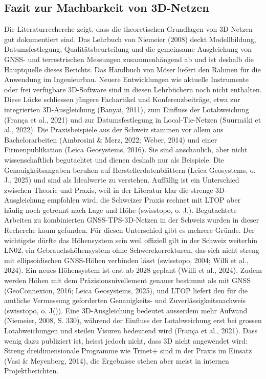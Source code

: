 \subsection{Fazit zur Machbarkeit von 3D-Netzen}
\label{sec:Fazit zur Literaturrecherche}

Die Literaturrecherche zeigt, dass die theoretischen Grundlagen von 3D-Netzen gut dokumentiert sind. 
Das Lehrbuch von Niemeier (2008) deckt Modellbildung, Datumsfestlegung, Qualitätsbeurteilung und die gemeinsame Ausgleichung von GNSS- und terrestrischen Messungen zusammenhängend ab und ist deshalb die Hauptquelle dieses Berichts.
Das Handbuch von Möser liefert den Rahmen für die Anwendung im Ingenieurbau.
Neuere Entwicklungen wie aktuelle Instrumente oder frei verfügbare 3D-Software sind in diesen Lehrbüchern noch nicht enthalten.
Diese Lücke schliessen jüngere Fachartikel und Konferenzbeiträge, etwa zur integrierten 3D-Ausgleichung (Banyai, 2011), zum Einfluss der Lotabweichung (França et al., 2021) und zur Datumsfestlegung in Local-Tie-Netzen (Suurmäki et al., 2022). 
Die Praxisbeispiele aus der Schweiz stammen vor allem aus Bachelorarbeiten (Ambrosini \& Merz, 2022; Weber, 2014) und einer Firmenpublikation (Leica Geosystems, 2016).
Sie sind anschaulich, aber nicht wissenschaftlich begutachtet und dienen deshalb nur als Beispiele.
Die Genauigkeitsangaben beruhen auf Herstellerdatenblättern (Leica Geosystems, o. J., 2025) und sind als Idealwerte zu verstehen. 
Auffällig ist ein Unterschied zwischen Theorie und Praxis, weil in der Literatur klar die strenge 3D-Ausgleichung empfohlen wird, die Schweizer Praxis rechnet mit LTOP aber häufig noch getrennt nach Lage und Höhe (swisstopo, o. J.). 
Begutachtete Arbeiten zu kombinierten GNSS-TPS-3D-Netzen in der Schweiz wurden in dieser Recherche kaum gefunden.
Für diesen Unterschied gibt es mehrere Gründe. 
Der wichtigste dürfte das Höhensystem sein weil offiziell gilt in der Schweiz weiterhin LN02, ein Gebrauchshöhensystem ohne Schwerekorrekturen, das sich nicht streng mit ellipsoidischen GNSS-Höhen verbinden lässt (swisstopo, 2004; Willi et al., 2024). 
Ein neues Höhensystem ist erst ab 2028 geplant (Willi et al., 2024). 
Zudem werden Höhen mit dem Präzisionsnivellement genauer bestimmt als mit GNSS (GeoConnexion, 2016; Leica Geosystems, 2025), und LTOP liefert den für die amtliche Vermessung geforderten Genauigkeits- und Zuverlässigkeitsnachweis (swisstopo, o. J()). 
Eine 3D-Ausgleichung bedeutet ausserdem mehr Aufwand (Niemeier, 2008, S. 330), während der Einfluss der Lotabweichung erst bei grossen Lotabweichungen und steilen Visuren bedeutend wird (França et al., 2021). 
Dass wenig dazu publiziert ist, heisst jedoch nicht, dass 3D nicht angewendet wird: Streng dreidimensionale Programme wie Trinet+ sind in der Praxis im Einsatz (Vasi \& Meyenberg, 2014), die Ergebnisse stehen aber meist in internen Projektberichten.
